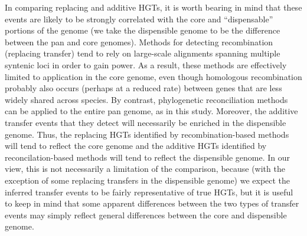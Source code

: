 \documentclass[12pt]{article}
\begin{document}
In comparing replacing and additive HGTs, it is worth bearing in mind that
these events are likely to be strongly correlated with the core and
``dispensable'' portions of the genome (we take the dispensible genome to
be the difference between the pan and core genomes).  Methods for detecting
recombination (replacing transfer) tend to rely on large-scale alignments
spanning multiple syntenic loci in order to gain power.  As a result, these
methods are effectively limited to application in the core genome, even
though homologous recombination probably also occurs (perhaps at a reduced
rate) between genes that are less widely shared across species.  By
contrast, phylogenetic reconciliation methods can be applied to the entire
pan genome, as in this study.  Moreover, the additive transfer events that
they detect will necessarily be enriched in the dispensible genome.  Thus,
the replacing HGTs identified by recombination-based methods will tend to
reflect the core genome and the additive HGTs identified by
reconcilation-based methods will tend to reflect the dispensible genome.
In our view, this is not necessarily a limitation of the comparison,
because (with the exception of some replacing transfers in the dispensible
genome) we expect the inferred transfer events to be fairly representative
of true HGTs, but it is useful to keep in mind that some apparent
differences between the two 
types of transfer events may simply reflect general differences between the
core and dispensible genome.

\end{document}
